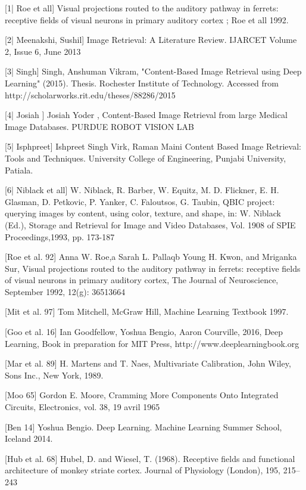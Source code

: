 [1| Roe et all] Visual projections routed to the auditory pathway in ferrets: receptive fields of visual neurons in primary auditory cortex ; Roe et all 1992. 

[2| Meenakshi, Sushil] Image Retrieval: A Literature Review. IJARCET Volume 2, Issue 6, June 2013

[3| Singh] Singh, Anshuman Vikram, "Content-Based Image Retrieval using Deep Learning" (2015). Thesis. Rochester Institute of Technology.  Accessed from http://scholarworks.rit.edu/theses/88286/2015

[4| Josiah ] Josiah Yoder , Content-Based Image Retrieval from large Medical Image Databases. PURDUE ROBOT VISION LAB 

[5| Isphpreet] Ishpreet Singh Virk, Raman Maini Content Based Image Retrieval: Tools and Techniques.  University College of Engineering, Punjabi University, Patiala.

[6| Niblack et all] W. Niblack, R. Barber, W. Equitz, M. D. Flickner, E. H. Glasman, D. Petkovic, P. Yanker, C. Faloutsos, G. Taubin, QBIC project: querying images by content, using color, texture, and shape, in: W. Niblack (Ed.), Storage and Retrieval for Image and Video Databases, Vol. 1908 of SPIE Proceedings,1993, pp. 173-187








[Roe et al. 92] Anna W. Roe,a Sarah L. Pallaqb Young H. Kwon, and Mriganka Sur, Visual projections routed to the auditory pathway in ferrets: receptive fields of visual neurons in primary auditory cortex, The Journal of Neuroscience, September 1992, 12(g): 36513664

[Mit et al. 97] Tom Mitchell, McGraw Hill, Machine Learning Textbook 1997.

[Goo et al. 16] Ian Goodfellow, Yoshua Bengio, Aaron Courville, 2016, Deep Learning, Book in preparation for MIT Press, http://www.deeplearningbook.org

[Mar et al. 89] H. Martens and T. Naes, Multivariate Calibration, John Wiley, Sons Inc., New York, 1989.

[Moo 65] Gordon E. Moore, Cramming More Components Onto Integrated Circuits, Electronics, vol. 38,‎ 19 avril 1965

[Ben 14] Yoshua Bengio. Deep Learning. Machine Learning Summer School, Iceland 2014.

[Hub et al. 68] Hubel, D. and Wiesel, T. (1968). Receptive fields and functional architecture of monkey striate cortex. Journal of Physiology (London), 195, 215–243

